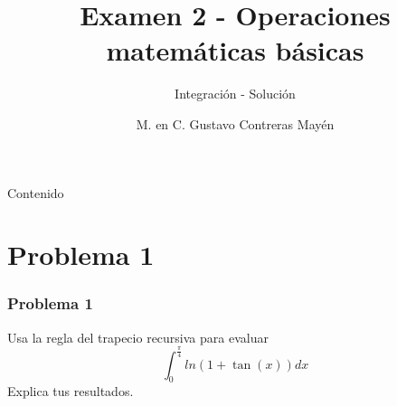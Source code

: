 \documentclass[12pt]{beamer}
\begin{document}
\title{Examen 2 - Operaciones matem\'{a}ticas b\'{a}sicas}
\subtitle{Integraci\'{o}n - Soluci\'{o}n}
\author{M. en C. Gustavo Contreras May\'{e}n}
\maketitle
\fontsize{14}{14}\selectfont
{}
\begin{frame}{Contenido}
\tableofcontents[pausesections]
\end{frame}
\section{Problema 1}
\begin{frame}
\frametitle{Problema 1}
Usa la regla del trapecio recursiva para evaluar
\[ \int_{0}^{\frac{\pi}{4}} ln(1 + \tan(x)) dx\]
Explica tus resultados.
\end{frame}
\end{document}
